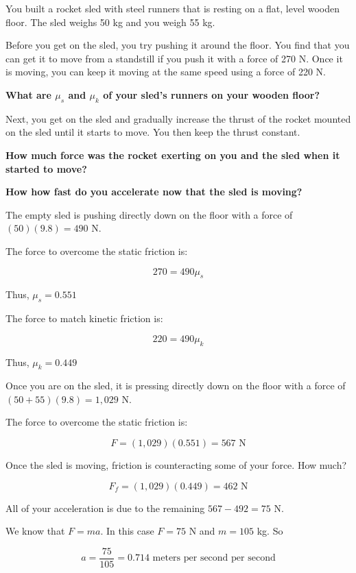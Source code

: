 \begin{Exercise}[title={Rocket Sled}, label=rocketsled1]
 
You built a rocket sled with steel runners that is resting on a flat, level wooden floor. The sled weighs 50 kg and you weigh 55 kg.

Before you get on the sled,  you try pushing it around the floor. You find that you can get it to move from a
standstill if you push it with a force of 270 N.  Once it is moving, you can keep it moving at the same speed using a force of 220 N.

\textbf{What are $\mu_s$ and $\mu_k$ of your sled's runners on your wooden floor?}

Next, you get on the sled and gradually increase the thrust of the rocket mounted on the sled until it starts to move. You then keep the thrust constant.

\textbf{How much force was the rocket exerting on you and the sled when it started to move?}

\textbf{How how fast do you accelerate now that the sled is moving?}

\end{Exercise}
\begin{Answer}[ref=rocketsled1]

The empty sled is pushing directly down on the floor with a force of $(50)(9.8) = 490$ N.

The force to overcome the static friction is:

$$270 = 490 \mu_s$$

Thus, $\mu_s = 0.551$

The force to match kinetic friction is:

$$220 = 490 \mu_k$$

Thus, $\mu_k = 0.449$

Once you are on the sled, it is pressing directly down on the floor with a force of $(50 + 55)(9.8) = 1,029$ N.

The force to overcome the static friction is:

$$F = (1,029)(0.551) = 567 \text{ N}$$

Once the sled is moving, friction is counteracting some of your force. How much?

$$F_f = (1,029)(0.449) = 462 \text{ N}$$

All of your acceleration is due to the remaining $567 - 492 = 75$ N.

We know that $F = ma$. In this case $F = 75$ N and $m = 105$ kg. So

$$a = \frac{75}{105} = 0.714 \text{ meters per second per second}$$

\end{Answer}

